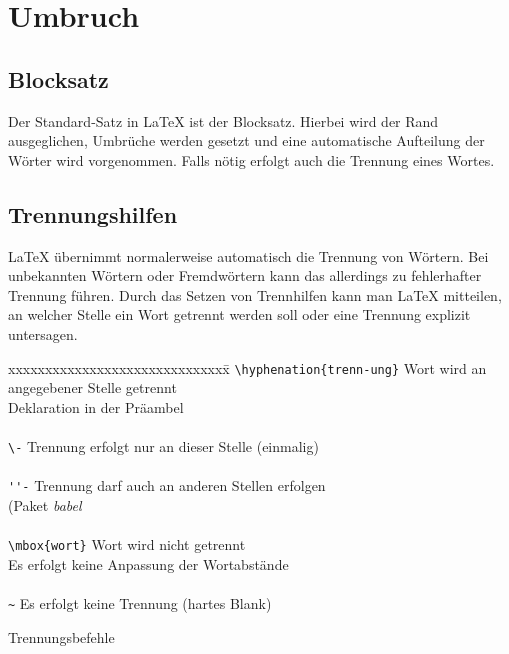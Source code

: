 \chapter{Umbruch}


\section{Blocksatz}
Der Standard-Satz in \LaTeX{} ist der Blocksatz. Hierbei wird der Rand ausgeglichen, Umbrüche werden gesetzt und eine automatische Aufteilung der Wörter wird vorgenommen. Falls nötig erfolgt auch die Trennung eines Wortes.
\section{Trennungshilfen}
\LaTeX{} übernimmt normalerweise automatisch die Trennung von Wörtern. Bei unbekannten Wörtern oder Fremdwörtern kann das allerdings zu fehlerhafter Trennung führen. Durch das Setzen von Trennhilfen kann man \LaTeX{} mitteilen, an welcher Stelle ein Wort getrennt werden soll oder eine Trennung explizit untersagen.
\begin{table}[H]
\begin{tabbing}
xxxxxxxxxxxxxxxxxxxxxxxxxxxxxx\=\kill
\verb=\hyphenation{trenn-ung}=			\>Wort wird an angegebener Stelle getrennt\\
								\>Deklaration in der Präambel\\
\\
\verb=\-=							\>Trennung erfolgt nur an dieser Stelle (einmalig)\\
\\
\verb=''-=							\>Trennung darf auch an anderen Stellen erfolgen\\
								\>(Paket \textsl{babel}\\
\\
\verb=\mbox{wort}=					\>Wort wird nicht getrennt\\
								\>Es erfolgt keine Anpassung der Wortabstände\\
\\
\verb=~=							\>Es erfolgt keine Trennung (hartes Blank)\\
\end{tabbing}
\caption{Trennungsbefehle}
\end{table}


